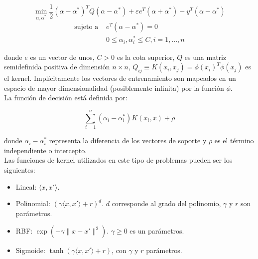 \documentclass[spanish]{article}
\begin{document}
                \begin{equation}
                    \min_{\alpha, \alpha^*} \frac{1}{2} (\alpha - \alpha^*)^T Q (\alpha - \alpha^*) 
                        + \varepsilon e^T (\alpha + \alpha^*) - y^T (\alpha - \alpha^*)
                    \nonumber
                \end{equation}
                \begin{equation}
                    \begin{split}
                        \textrm {sujeto a } & e^T (\alpha - \alpha^*) = 0\\
                            & 0 \leq \alpha_i, \alpha_i^* \leq C, i=1, ..., n
                    \end{split}
                \end{equation}
    
                donde $e$ es un vector de unos, $C > 0$ es la cota superior, $Q$ es una matriz semidefinida positiva de dimensión $n \times n$, 
                $Q_{ij} \equiv K(x_i, x_j) = \phi (x_i)^T \phi (x_j)$ es el kernel. Implícitamente los vectores de entrenamiento son mapeados 
                en un espacio de mayor dimensionalidad (posiblemente infinita) por la función $\phi$. \\
                
                La función de decisión está definida por:
                
                \begin{equation}
                    \sum_{i=1}^n (\alpha_i - \alpha_i^*) K(x_i, x) + \rho
                \end{equation}
                
                donde $\alpha_i - \alpha_i^*$ representa la diferencia de los vectores de soporte y $\rho$ es el término independiente o intercepto. \\
                
                Las funciones de kernel utilizados en este tipo de problemas pueden ser los siguientes:
                \begin{itemize}
                    \item Lineal: $\langle x, x'\rangle$.
                    \item Polinomial: $(\gamma \langle x, x'\rangle + r)^d$. $d$ corresponde al grado del polinomio, $\gamma$ y $r$ son parámetros.
                    \item RBF: $\exp(-\gamma \|x-x'\|^2)$. $\gamma\geq 0$ es un parámetros.
                    \item Sigmoide: $\tanh(\gamma \langle x,x'\rangle + r)$, con $\gamma$ y $r$ parámetros.
                \end{itemize}
                
\end{document}

